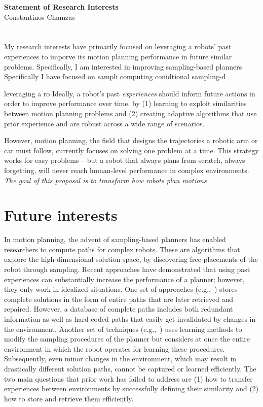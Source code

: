 \documentclass[12pt]{article}
\begin{document}
\begin{center}
  {\large \textbf{Statement of Research Interests}} \\[0.1em]
  {Constantinos Chamzas}
\end{center}
\vspace{-10pt}

\section{}
My research interests have primarily focused on leveraging a robots' past experiences to imporve its motion planning performance in future similar problems. %
Specifically, I am interested in improving sampling-based planners    
Specifically I have focused on sampli computing conidtional sampling-d

leveraging a ro
Ideally, a robot's past \textit{experiences} should inform future actions in order to improve performance over time.
by (1) learning to exploit similarities between motion planning problems and (2) creating adaptive algorithms that use prior experience and are robust across a wide range of scenarios.



However, motion planning, the field that designs the trajectories a robotic arm or car must follow, currently focuses on solving one problem at a time.
This strategy works for easy problems -- but a robot that always plans from scratch, always forgetting, will never reach human-level performance in complex environments. \textit{The goal of this proposal is to transform how robots plan motions} 
\section{Future interests}
In motion planning, the advent of sampling-based planners has enabled researchers to compute paths for complex robots. These are algorithms that explore the high-dimensional solution space, by discovering free placements of the robot through sampling. 
Recent approaches have demonstrated that using past experiences can substantially increase the performance of a planner; however, they only work in idealized situations. One set of approaches (e.g.,~\cite{Coleman2015})  stores complete solutions in the form of entire paths that are later retrieved and repaired. However, a  database of complete paths includes both redundant information as well as hard-coded paths that easily get invalidated by changes in the environment. Another set of techniques (e.g.,~\cite{Ichter2018}) uses learning methods to modify the sampling procedures of the planner but considers at once the entire environment in which the robot operates for learning these procedures. Subsequently, even minor changes in the environment, which may result in drastically different solution paths, cannot be captured or learned efficiently. The two main questions that prior work has failed to address are (1) how to transfer experiences between environments by successfully defining their similarity and (2) how to store and retrieve them efficiently. 
\end{document}
